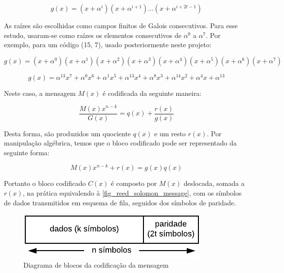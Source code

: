 	\begin{equation}
	g(x) = (x + \alpha^{i})(x + \alpha^{i+1})...(x + \alpha^{i + 2t - 1})  
	\end{equation}
	
	
	As raízes são escolhidas como campos finitos de Galois consecutivos. Para esse estudo, usaram-se como raízes os elementos consecutivos de $\alpha^{0}$ a $\alpha^{7}$. Por exemplo, para um código (15, 7), usado posteriormente neste projeto:
	 
	\begin{equation}
	g(x) = (x + \alpha^{0})(x + \alpha^{1})(x + \alpha^{2})(x + \alpha^{3})(x + \alpha^{4})(x + \alpha^{5})(x + \alpha^{6})(x + \alpha^{7})
	\end{equation}
	 
	\begin{equation}
	g(x) = \alpha^{13}x^{7} + \alpha^{0}x^{6} + \alpha^{1}x^{5} + \alpha^{13}x^{4} + \alpha^{8}x^{3} + \alpha^{14}x^{2} + \alpha^{4}x + \alpha^{13}
	\end{equation}
	
	
	Neste caso, a mensagem $M(x)$ é codificada da seguinte maneira:
	
	
	\begin{equation}
	\frac{M(x)x^{n-k}}{G(x)} = q(x) + \frac{r(x)}{g(x)}
	\end{equation}
	
	 
	Desta forma, são produzidos um quociente $q(x)$ e um resto $r(x)$. Por manipulação algébrica, temos que o bloco codificado pode ser representado da seguinte forma:
	 
	\begin{equation}
	M(x)x^{n-k} + r(x) = g(x)q(x)
	\end{equation}
	
	
	Portanto o bloco codificado $C(x)$ é composto por $M(x)$ deslocada, somada a $r(x)$, na prática equivalendo à \autoref{fig_reed_solomon_message}, com os símbolos de dados transmitidos em esquema de fila, seguidos dos símbolos de paridade.
	
	\begin{figure}[!htb]
		\caption{\label{fig_reed_solomon_message} Diagrama de blocos da codificação da mensagem}
		\centering
		\includegraphics[width=0.4\textheight]{frame/rs-codeword.pdf}
	\end{figure}
	
